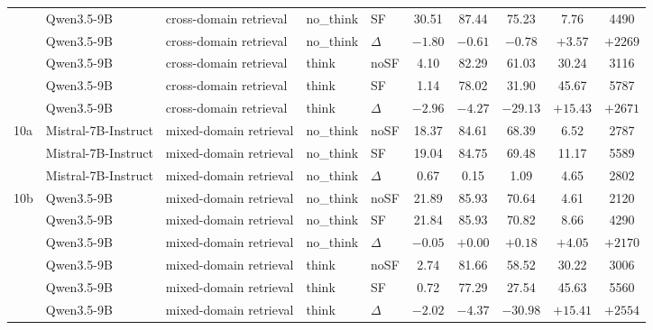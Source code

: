 \begin{scriptsize}
\begin{longtable}{l l l l l c c c c c}
 & Qwen3.5-9B & cross-domain retrieval & no\_think & SF & 30.51 & 87.44 & 75.23 & 7.76 & 4490 \\
 & Qwen3.5-9B & cross-domain retrieval & no\_think & $\Delta$ & $-1.80$ & $-0.61$ & $-0.78$ & $+3.57$ & $+2269$ \\
 & Qwen3.5-9B & cross-domain retrieval & think & noSF & 4.10 & 82.29 & 61.03 & 30.24 & 3116 \\
 & Qwen3.5-9B & cross-domain retrieval & think & SF & 1.14 & 78.02 & 31.90 & 45.67 & 5787 \\
 & Qwen3.5-9B & cross-domain retrieval & think & $\Delta$ & $-2.96$ & $-4.27$ & $-29.13$ & $+15.43$ & $+2671$ \\
\dmidrule
10a & Mistral-7B-Instruct & mixed-domain retrieval & no\_think & noSF & 18.37 & 84.61 & 68.39 & 6.52 & 2787 \\
 & Mistral-7B-Instruct & mixed-domain retrieval & no\_think & SF & 19.04 & 84.75 & 69.48 & 11.17 & 5589 \\
 & Mistral-7B-Instruct & mixed-domain retrieval & no\_think & $\Delta$ & 0.67 & 0.15 & 1.09 & 4.65 & 2802 \\
10b & Qwen3.5-9B & mixed-domain retrieval & no\_think & noSF & 21.89 & 85.93 & 70.64 & 4.61 & 2120 \\
 & Qwen3.5-9B & mixed-domain retrieval & no\_think & SF & 21.84 & 85.93 & 70.82 & 8.66 & 4290 \\
 & Qwen3.5-9B & mixed-domain retrieval & no\_think & $\Delta$ & $-0.05$ & $+0.00$ & $+0.18$ & $+4.05$ & $+2170$ \\
 & Qwen3.5-9B & mixed-domain retrieval & think & noSF & 2.74 & 81.66 & 58.52 & 30.22 & 3006 \\
 & Qwen3.5-9B & mixed-domain retrieval & think & SF & 0.72 & 77.29 & 27.54 & 45.63 & 5560 \\
 & Qwen3.5-9B & mixed-domain retrieval & think & $\Delta$ & $-2.02$ & $-4.37$ & $-30.98$ & $+15.41$ & $+2554$ \\
\end{longtable}
\end{scriptsize}
